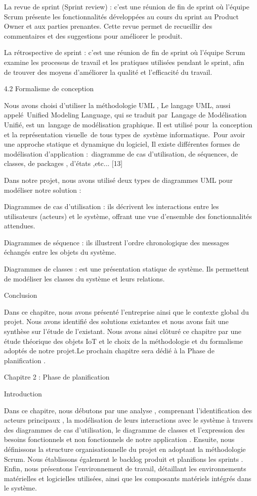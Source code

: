 \documentclass{article}
\begin{document}
La revue de sprint (Sprint review) : c’est une réunion de fin de sprint où l’équipe Scrum présente les fonctionnalités développées au cours du sprint au Product Owner et aux parties prenantes. Cette revue permet de recueillir des commentaires et des suggestions pour améliorer le produit.

La rétrospective de sprint : c’est une réunion de fin de sprint où l’équipe Scrum examine les processus de travail et les pratiques utilisées pendant le sprint, afin de trouver des moyens d’améliorer la qualité et l’efficacité du travail.

4.2 Formalisme de conception

Nous avons choisi d’utiliser la méthodologie UML , Le langage UML, aussi appelé Unified Modeling Language, qui se traduit par Langage de Modélisation Unifié, est un langage de modélisation graphique. Il est utilisé pour la conception et la représentation visuelle de tous types de système informatique. Pour avoir une approche statique et dynamique du logiciel, Il existe différentes formes de modélisation d’application : diagramme de cas d’utilisation, de séquences, de classes, de packages  , d’états ,etc... [13]

Dans notre projet, nous avons utilisé deux types de diagrammes UML pour modéliser notre solution :​

Diagrammes de cas d'utilisation : ils décrivent les interactions entre les utilisateurs (acteurs) et le système, offrant une vue d'ensemble des fonctionnalités attendues. ​

Diagrammes de séquence : ils illustrent l'ordre chronologique des messages échangés entre les objets du système. 

Diagrammes de classes : est une présentation statique de système. Ils permettent de modéliser les classes du système et leurs relations.

Conclusion

Dans ce chapitre, nous avons présenté l’entreprise ainsi que le contexte global du projet. Nous avons identifié des solutions existantes et nous avons fait une synthèse  sur l’étude de l’existant. Nous avons ainsi clôturé ce chapitre par une étude théorique des objets IoT et  le choix de la méthodologie et du formalisme adoptés de notre projet.Le prochain chapitre sera dédié à la Phase de planification .

Chapitre 2 : Phase de planification

Introduction 

Dans  ce  chapitre,  nous  débutons par une analyse , comprenant l'identification des acteurs principaux , la modélisation de leurs interactions avec le système à travers des diagrammes de cas d'utilisation, le diagramme de classes et l’expression des besoins fonctionnels et non fonctionnels de notre application . Ensuite, nous définissons la structure organisationnelle du projet en adoptant la méthodologie Scrum. Nous établissons également le backlog produit et planifions les sprints . Enfin, nous présentons l'environnement de travail, détaillant les environnements matérielles et logicielles utilisées, ainsi que les composants matériels intégrés dans le système.
\end{document}
